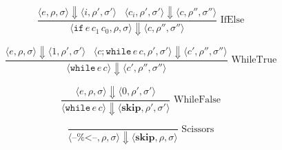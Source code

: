 \documentclass[a4paper]{article}
\newcommand{\cskip}{\textbf{skip}}
\newcommand{\mem}{\rho}
\newcommand{\glob}{\sigma}
\newcommand{\bkt}[1]{\langle #1\rangle}
\newcommand{\eval}{\Downarrow}
\newcommand{\also}{\,\,\,\,\,}
\newcommand{\semrule}[3]{\[\dfrac{#2}{#3}\,\,\text{#1}\]}
\begin{document}
\semrule{IfElse}
{\bkt{e,\mem,\glob} \eval \bkt{i,\mem',\glob'}
\also \bkt{c_i,\mem',\glob'} \eval \bkt{c,\mem'',\glob''}}
{\bkt{\texttt{if}\,e\,c_1\,c_0,\mem,\glob} \eval \bkt{c,\mem'',\glob''}}

\semrule{WhileTrue}
{\bkt{e,\mem,\glob} \eval \bkt{1,\mem',\glob'}
\also \bkt{c;\texttt{while}\,e\,c,\mem',\glob'} \eval \bkt{c',\mem'',\glob''}}
{\bkt{\texttt{while}\,e\,c} \eval \bkt{c',\mem'',\glob''}}

\semrule{WhileFalse}
{\bkt{e,\mem,\glob} \eval \bkt{0,\mem',\glob'}}
{\bkt{\texttt{while}\,e\,c} \eval \bkt{\cskip,\mem',\glob'}}

\semrule{Scissors}
{}
{\bkt{\texttt{--\%<--},\mem,\glob} \eval \bkt{\cskip,\mem,\glob}}
\end{document}
